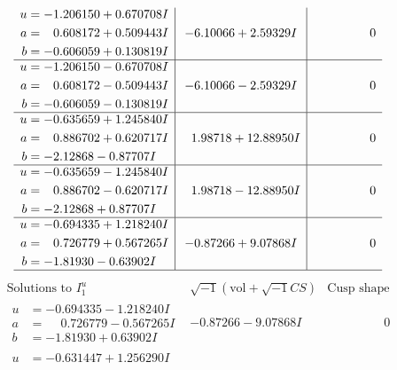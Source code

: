 \documentclass[1p]{elsarticle_modified}
\theoremstyle{definition}
\newcommand{\I}{\sqrt{-1}}
\begin{document}
$$\begin{array}{c|c|c}
\begin{aligned}
u &= -1.206150 + 0.670708 I \\
a &= \phantom{-}0.608172 + 0.509443 I \\
b &= -0.606059 + 0.130819 I\end{aligned}
 & -6.10066 + 2.59329 I & \phantom{-0.000000 } 0 \\ \hline\begin{aligned}
u &= -1.206150 - 0.670708 I \\
a &= \phantom{-}0.608172 - 0.509443 I \\
b &= -0.606059 - 0.130819 I\end{aligned}
 & -6.10066 - 2.59329 I & \phantom{-0.000000 } 0 \\ \hline\begin{aligned}
u &= -0.635659 + 1.245840 I \\
a &= \phantom{-}0.886702 + 0.620717 I \\
b &= -2.12868 - 0.87707 I\end{aligned}
 & \phantom{-}1.98718 + 12.88950 I & \phantom{-0.000000 } 0 \\ \hline\begin{aligned}
u &= -0.635659 - 1.245840 I \\
a &= \phantom{-}0.886702 - 0.620717 I \\
b &= -2.12868 + 0.87707 I\end{aligned}
 & \phantom{-}1.98718 - 12.88950 I & \phantom{-0.000000 } 0 \\ \hline\begin{aligned}
u &= -0.694335 + 1.218240 I \\
a &= \phantom{-}0.726779 + 0.567265 I \\
b &= -1.81930 - 0.63902 I\end{aligned}
 & -0.87266 + 9.07868 I & \phantom{-0.000000 } 0\\
 \hline 
 \end{array}$$\newpage$$\begin{array}{c|c|c}  
\text{Solutions to }I^u_{1}& \I (\text{vol} + \sqrt{-1}CS) & \text{Cusp shape}\\
 \hline 
\begin{aligned}
u &= -0.694335 - 1.218240 I \\
a &= \phantom{-}0.726779 - 0.567265 I \\
b &= -1.81930 + 0.63902 I\end{aligned}
 & -0.87266 - 9.07868 I & \phantom{-0.000000 } 0 \\ \hline\begin{aligned}
u &= -0.631447 + 1.256290 I \\

\end{aligned}
\end{array}$$
\end{document}
